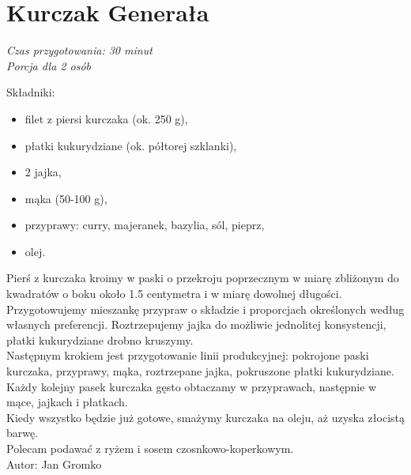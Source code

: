 \section{Kurczak Generała}
\vspace*{8pt}


\textit{Czas przygotowania: 30 minut}\\
\textit{Porcja dla 2 osób}\\

\vspace{2pt}

Składniki:
\begin{itemize}
	\item filet z piersi kurczaka (ok. 250 g),
	\item płatki kukurydziane (ok. półtorej szklanki),
	\item 2 jajka,
	\item mąka (50-100 g),
	\item przyprawy: curry, majeranek, bazylia, sól, pieprz,
	\item olej.
\end{itemize}

Pierś z kurczaka kroimy w paski o przekroju poprzecznym w miarę zbliżonym do kwadratów o boku około 1.5 centymetra i w miarę dowolnej długości.\\

Przygotowujemy mieszankę przypraw o składzie i proporcjach określonych według własnych preferencji. Roztrzepujemy jajka do możliwie jednolitej konsystencji, płatki kukurydziane drobno kruszymy.\\

Następnym krokiem jest przygotowanie linii produkcyjnej: pokrojone paski kurczaka, przyprawy, mąka, roztrzepane jajka, pokruszone płatki kukurydziane.
Każdy kolejny pasek kurczaka gęsto obtaczamy w przyprawach, następnie w mące, jajkach i płatkach.\\

Kiedy wszystko będzie już gotowe, smażymy kurczaka na oleju, aż uzyska złocistą barwę.\\

Polecam podawać z ryżem i sosem czosnkowo-koperkowym.\\

Autor: Jan Gromko

